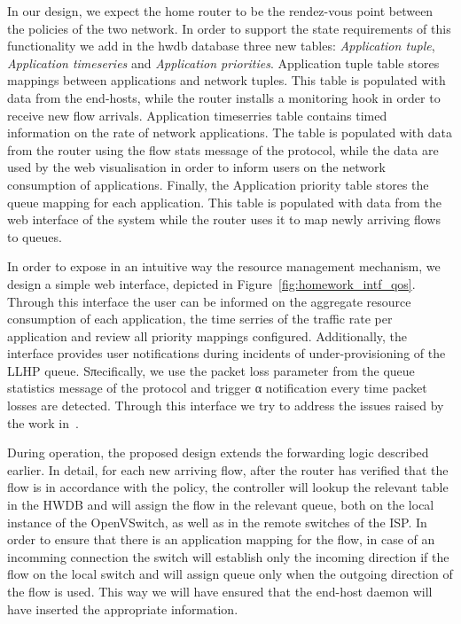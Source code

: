 In our design, we expect the home router to be the rendez-vous point between the
policies of the two network. In order to support the state requirements of this
functionality we add in the hwdb database three new tables: {\it Application
  tuple}, {\it Application timeseries} and {\it Application priorities}.
Application tuple table stores mappings between applications and 
network tuples. This table is populated with data from the end-hosts, while the
router installs a monitoring hook in order to receive new flow arrivals.
Application timeserries table contains timed information on the rate of network
applications. The table is populated with data from the router using the
flow stats message of the \of protocol, while the data are used by the web
visualisation in order to inform users on the network consumption of
applications. Finally, the Application priority table stores the queue mapping
for each application. This table is populated with data from the web interface
of the system while the router uses it to map newly arriving flows to
queues. 

In order to expose in an intuitive way the resource management mechanism, we
design a simple web interface, depicted in Figure~\ref{fig:homework_intf_qos}.
Through this interface the user can be informed on the aggregate resource
consumption of each application, the time serries of the traffic rate per
application and review all priority mappings configured. Additionally, the
interface provides user notifications during incidents of  under-provisioning of
the LLHP queue. Sπecifically, we use the packet loss parameter from the queue
statistics message of the \of protocol and trigger α notification every time
packet losses are detected.  Through this interface we try to address the issues
raised by the work in~\cite{Chetty10}. 

During operation, the proposed design extends the forwarding logic described
earlier. In detail, for each new arriving flow, after the router has verified
that the flow is in accordance with the policy, the
controller will lookup the relevant table in the HWDB and will assign the flow
in the relevant queue, both on the local instance of the OpenVSwitch, as well as
in the remote switches of the ISP. In order to ensure that there is an
application mapping for the flow, in case of an incomming connection the switch
will establish only the incoming direction if the flow on the local switch and
will assign queue only when the outgoing direction of the flow is used. This way
we will have ensured that the end-host daemon will have inserted the appropriate
information. 

